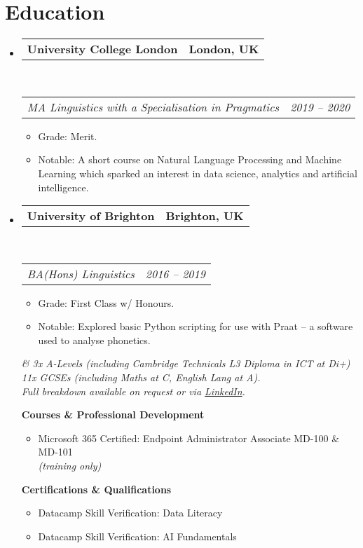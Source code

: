 \documentclass[10pt,a4paper]{article}
\makeatletter
\newcommand{\headerrow}[2]
{\begin{tabular*}{\linewidth}{l@{\extracolsep{\fill}}r}
	#1 &
	#2 \\
\end{tabular*}}
\makeatother
\begin{document}
\section*{Education}

\begin{itemize}
	\parskip=0.1em

	\item 
	\headerrow
		{\textbf{University College London}}
		{\textbf{London, UK}}
	\\
	\headerrow
		{\emph{MA Linguistics with a Specialisation in Pragmatics}}
		{\emph{2019 -- 2020}}
	\begin{itemize}
		\item Grade: Merit.
		\item Notable: A short course on Natural Language Processing and Machine Learning which sparked an interest in data science, analytics and artificial intelligence.
	\end{itemize}
    \item 
	\headerrow
		{\textbf{University of Brighton}}
		{\textbf{Brighton, UK}}
	\\
	\headerrow
		{\emph{BA(Hons) Linguistics}}
		{\emph{2016 -- 2019}}
	\begin{itemize}
		\item Grade: First Class w/ Honours.
		\item Notable: Explored basic Python scripting for use with Praat -- a software used to analyse phonetics.
	\end{itemize}
	\begin{center}
        \emph{\color{gray}\small \& 3x A-Levels (including Cambridge Technicals L3 Diploma in ICT at Di+)\\11x GCSEs (including Maths at C, English Lang at A). \\ Full breakdown available on request or via \href{https://www.linkedin.com/in/artydh}{LinkedIn}.}
    \end{center}
	\textbf{Courses \& Professional Development}
	\begin{itemize}
		\item Microsoft 365 Certified: Endpoint Administrator Associate MD-100 \& MD-101
		\\\small\emph{(training only)}
	\end{itemize}
	\textbf{Certifications \& Qualifications}
	\begin{itemize}
		\item Datacamp Skill Verification: Data Literacy
		\item Datacamp Skill Verification: AI Fundamentals
	\end{itemize}
\end{itemize}
\end{document}
